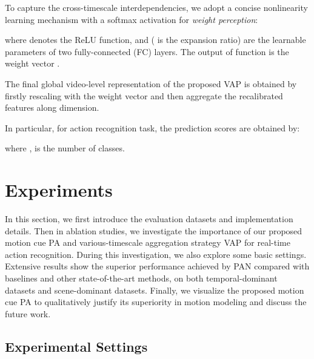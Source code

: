 \documentclass[journal]{IEEEtran}
\begin{document}
To capture the cross-timescale interdependencies, we adopt a concise nonlinearity learning mechanism with a softmax activation for \emph{weight perception}:



\noindent where  denotes the ReLU function,  and  ( is the expansion ratio) are the learnable parameters of two fully-connected (FC) layers. The output of  function is the weight vector .

The final global video-level representation  of the proposed VAP is obtained by firstly rescaling  with the weight vector  and then aggregate the recalibrated features along  dimension.



In particular, for action recognition task, the prediction scores  are obtained by:



\noindent where ,  is the number of classes.




















\section{Experiments}



In this section, we first introduce the evaluation datasets and implementation details. Then in ablation studies, we investigate the importance of our proposed motion cue PA and various-timescale aggregation strategy VAP for real-time action recognition. During this investigation, we also explore some basic settings. Extensive results show the superior performance achieved by PAN compared with baselines and other state-of-the-art methods, on both temporal-dominant datasets and scene-dominant datasets. Finally, we visualize the proposed motion cue PA to qualitatively justify its superiority in motion modeling and discuss the future work.

\subsection{Experimental Settings} \label{exp_set}
\end{document}
